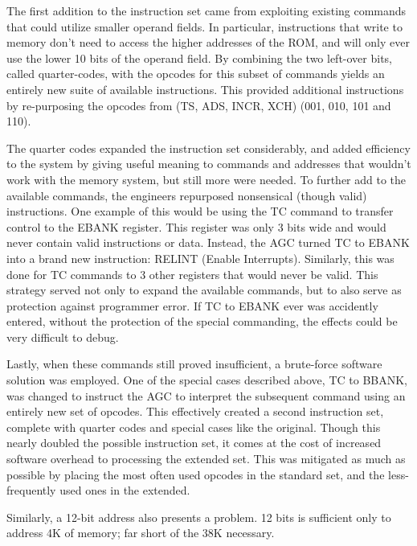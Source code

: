 \documentclass[a4paper,11pt]{article}
\begin{document}
The first addition to the instruction set came from exploiting existing commands that could utilize smaller operand fields.  In particular, instructions that write to memory don't need to access the higher addresses of the ROM, and will only ever use the lower 10 bits of the operand field. By combining the two left-over bits, called quarter-codes, with the opcodes for this subset of commands yields an entirely new suite of available instructions.  This provided additional instructions by re-purposing the opcodes from (TS, ADS, INCR, XCH) (001, 010, 101 and 110).

The quarter codes expanded the instruction set considerably, and added efficiency to the system by giving useful meaning to commands and addresses that wouldn't work with the memory system, but still more were needed.  To further add to the available commands, the engineers repurposed nonsensical (though valid) instructions.  One example of this would be using the TC command to transfer control to the EBANK register.  This register was only 3 bits wide and would never contain valid instructions or data.  Instead, the AGC turned TC to EBANK into a brand new instruction: RELINT (Enable Interrupts).  Similarly, this was done for TC commands to 3 other registers that would never be valid.  This strategy served not only to expand the available commands, but to also serve as protection against programmer error.  If TC to EBANK ever was accidently entered, without the protection of the special commanding, the effects could be very difficult to debug.

Lastly, when these commands still proved insufficient, a brute-force software solution was employed.  One of the special cases described above, TC to BBANK, was changed to instruct the AGC to interpret the subsequent command using an entirely new set of opcodes.  This effectively created a second instruction set, complete with quarter codes and special cases like the original.  Though this nearly doubled the possible instruction set, it comes at the cost of increased software overhead to processing the extended set.  This was mitigated as much as possible by placing the most often used opcodes in the standard set, and the less-frequently used ones in the extended.

Similarly, a 12-bit address also presents a problem.  12 bits is sufficient only to address 4K of memory; far short of the 38K necessary. 
\end{document}
